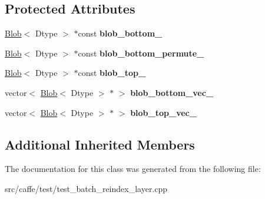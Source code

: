 \subsection*{Protected Attributes}
\begin{DoxyCompactItemize}
\item 
\mbox{\label{classcaffe_1_1_batch_reindex_layer_test_a25ecb2e3518d58066683b9b6240592be}} 
\mbox{\hyperlink{classcaffe_1_1_blob}{Blob}}$<$ Dtype $>$ $\ast$const {\bfseries blob\+\_\+bottom\+\_\+}
\item 
\mbox{\label{classcaffe_1_1_batch_reindex_layer_test_ae8f2f2b365a973d54838cbac818dfa28}} 
\mbox{\hyperlink{classcaffe_1_1_blob}{Blob}}$<$ Dtype $>$ $\ast$const {\bfseries blob\+\_\+bottom\+\_\+permute\+\_\+}
\item 
\mbox{\label{classcaffe_1_1_batch_reindex_layer_test_ab0473545e699e0fca6fb4ec47a5fb21d}} 
\mbox{\hyperlink{classcaffe_1_1_blob}{Blob}}$<$ Dtype $>$ $\ast$const {\bfseries blob\+\_\+top\+\_\+}
\item 
\mbox{\label{classcaffe_1_1_batch_reindex_layer_test_a9ec3b4138d7ce348101af15ad40ded93}} 
vector$<$ \mbox{\hyperlink{classcaffe_1_1_blob}{Blob}}$<$ Dtype $>$ $\ast$ $>$ {\bfseries blob\+\_\+bottom\+\_\+vec\+\_\+}
\item 
\mbox{\label{classcaffe_1_1_batch_reindex_layer_test_a7866820785c72d19371e1edd408fc5b9}} 
vector$<$ \mbox{\hyperlink{classcaffe_1_1_blob}{Blob}}$<$ Dtype $>$ $\ast$ $>$ {\bfseries blob\+\_\+top\+\_\+vec\+\_\+}
\end{DoxyCompactItemize}
\subsection*{Additional Inherited Members}


The documentation for this class was generated from the following file\+:\begin{DoxyCompactItemize}
\item 
src/caffe/test/test\+\_\+batch\+\_\+reindex\+\_\+layer.\+cpp\end{DoxyCompactItemize}
